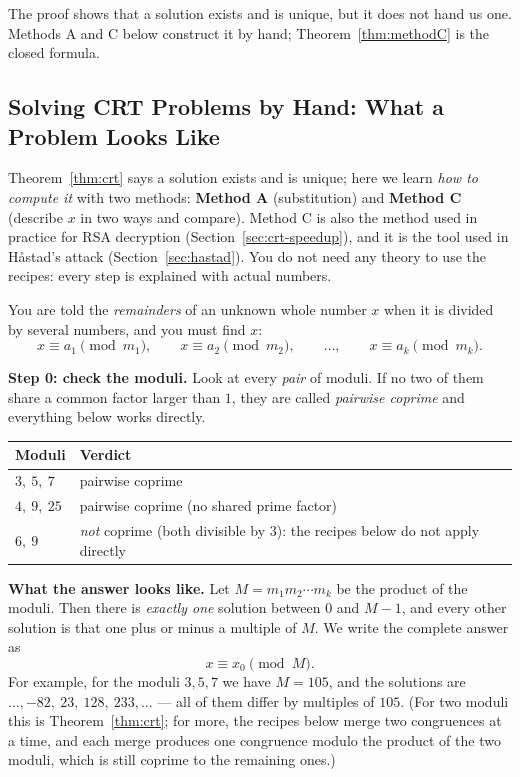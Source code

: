 \documentclass[11pt]{article}
\theoremstyle{definition}
\theoremstyle{remark}
\begin{document}
The proof shows that a solution exists and is unique, but it does not hand us one. Methods A and C below construct it by hand; Theorem~\ref{thm:methodC} is the closed formula.

\subsection{Solving CRT Problems by Hand: What a Problem Looks Like}\label{sec:crtmethods}

Theorem~\ref{thm:crt} says a solution exists and is unique; here we learn \emph{how to compute it} with two methods: \textbf{Method A} (substitution) and \textbf{Method C} (describe $x$ in two ways and compare). Method C is also the method used in practice for RSA decryption (Section~\ref{sec:crt-speedup}), and it is the tool used in H{\aa}stad's attack (Section~\ref{sec:hastad}). You do not need any theory to use the recipes: every step is explained with actual numbers.


You are told the \emph{remainders} of an unknown whole number $x$ when it is divided by several numbers, and you must find $x$:
\[
x\equiv a_1 \pmod{m_1},\qquad x\equiv a_2 \pmod{m_2},\qquad \dots,\qquad x\equiv a_k \pmod{m_k}.
\]

\textbf{Step 0: check the moduli.} Look at every \emph{pair} of moduli. If no two of them share a common factor larger than $1$, they are called \emph{pairwise coprime} and everything below works directly.
\begin{center}
\begin{tabular}{ll}
\toprule
Moduli & Verdict \\
\midrule
$3,\ 5,\ 7$ & pairwise coprime \\
$4,\ 9,\ 25$ & pairwise coprime (no shared prime factor) \\
$6,\ 9$ & \emph{not} coprime (both divisible by $3$): the recipes below do not apply directly \\
\bottomrule
\end{tabular}
\end{center}

\textbf{What the answer looks like.} Let $M=m_1m_2\cdots m_k$ be the product of the moduli. Then there is \emph{exactly one} solution between $0$ and $M-1$, and every other solution is that one plus or minus a multiple of $M$. We write the complete answer as
\[
x\equiv x_0 \pmod M.
\]
For example, for the moduli $3,5,7$ we have $M=105$, and the solutions are $\dots,-82,\ 23,\ 128,\ 233,\dots$ --- all of them differ by multiples of $105$. (For two moduli this is Theorem~\ref{thm:crt}; for more, the recipes below merge two congruences at a time, and each merge produces one congruence modulo the product of the two moduli, which is still coprime to the remaining ones.)
\end{document}
